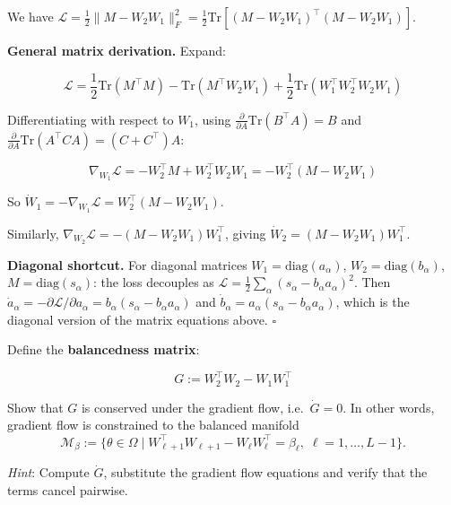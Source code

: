 \documentclass[11pt]{article}
\begin{document}
\begin{solution}[ex:td-2a]
We have
\(\mathcal{L} = \frac{1}{2}\|M - W_2 W_1\|_F^2 = \frac{1}{2}\text{Tr}\left[(M - W_2 W_1)^\top(M - W_2 W_1)\right]\).

\textbf{General matrix derivation.} Expand:

\[\mathcal{L} = \frac{1}{2}\text{Tr}(M^\top M) - \text{Tr}(M^\top W_2 W_1) + \frac{1}{2}\text{Tr}(W_1^\top W_2^\top W_2 W_1)\]

Differentiating with respect to \(W_1\), using
\(\frac{\partial}{\partial A}\text{Tr}(B^\top A) = B\) and
\(\frac{\partial}{\partial A}\text{Tr}(A^\top C A) = (C + C^\top)A\):

\[\nabla_{W_1}\mathcal{L} = -W_2^\top M + W_2^\top W_2 W_1 = -W_2^\top(M - W_2 W_1)\]

So \(\dot{W}_1 = -\nabla_{W_1}\mathcal{L} = W_2^\top(M - W_2 W_1)\).

Similarly, \(\nabla_{W_2}\mathcal{L} = -(M - W_2 W_1)W_1^\top\), giving
\(\dot{W}_2 = (M - W_2 W_1)W_1^\top\).

\textbf{Diagonal shortcut.} For diagonal matrices
\(W_1 = \text{diag}(a_\alpha)\), \(W_2 = \text{diag}(b_\alpha)\),
\(M = \text{diag}(s_\alpha)\): the loss decouples as
\(\mathcal{L} = \frac{1}{2}\sum_\alpha(s_\alpha - b_\alpha a_\alpha)^2\).
Then
\(\dot{a}_\alpha = -\partial\mathcal{L}/\partial a_\alpha = b_\alpha(s_\alpha - b_\alpha a_\alpha)\)
and \(\dot{b}_\alpha = a_\alpha(s_\alpha - b_\alpha a_\alpha)\), which
is the diagonal version of the matrix equations above. \(\square\)
\end{solution}

\begin{exercise}
\label{ex:td-2b}
Define the \textbf{balancedness matrix}:

\[G := W_2^\top W_2 - W_1 W_1^\top\]

Show that \(G\) is conserved under the gradient flow,
i.e.~\(\dot{G} = 0\). In other words, gradient flow is constrained to the balanced manifold \begin{equation*}
    \mathcal{M}_{\beta}
    :=
    \{\theta\in\Omega\mid
    W_{\ell+1}^{\top}W_{\ell+1}
    -
    W_{\ell}W_{\ell}^{\top}
    =
    \beta_\ell,\;
    \ell=1,\ldots,L-1\}.
\end{equation*}

\emph{Hint}: Compute
\(\dot{G}\),
substitute the gradient flow equations and verify that the
terms cancel pairwise.
\end{exercise}
\end{document}
